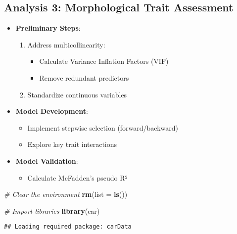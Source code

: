 \documentclass[
]{article}
\newenvironment{Shaded}{\begin{snugshade}}{\end{snugshade}}
\newcommand{\AttributeTok}[1]{\textcolor[rgb]{0.13,0.29,0.53}{#1}}
\newcommand{\CommentTok}[1]{\textcolor[rgb]{0.56,0.35,0.01}{\textit{#1}}}
\newcommand{\FunctionTok}[1]{\textcolor[rgb]{0.13,0.29,0.53}{\textbf{#1}}}
\newcommand{\NormalTok}[1]{#1}
\providecommand{\tightlist}{%
  \setlength{\itemsep}{0pt}\setlength{\parskip}{0pt}}
\begin{document}
\hypertarget{analysis-3-morphological-trait-assessment}{%
\subsection{Analysis 3: Morphological Trait
Assessment}\label{analysis-3-morphological-trait-assessment}}

\begin{itemize}
\tightlist
\item
  \textbf{Preliminary Steps}:

  \begin{enumerate}
  \def\labelenumi{\arabic{enumi}.}
  \tightlist
  \item
    Address multicollinearity:

    \begin{itemize}
    \tightlist
    \item
      Calculate Variance Inflation Factors (VIF)
    \item
      Remove redundant predictors
    \end{itemize}
  \item
    Standardize continuous variables
  \end{enumerate}
\item
  \textbf{Model Development}:

  \begin{itemize}
  \tightlist
  \item
    Implement stepwise selection (forward/backward)
  \item
    Explore key trait interactions
  \end{itemize}
\item
  \textbf{Model Validation}:

  \begin{itemize}
  \tightlist
  \item
    Calculate McFadden's pseudo R²
  \end{itemize}
\end{itemize}

\begin{Shaded}
\begin{Highlighting}[]
\CommentTok{\# Clear the environment}
\FunctionTok{rm}\NormalTok{(}\AttributeTok{list =} \FunctionTok{ls}\NormalTok{())}

\CommentTok{\# Import libraries}
\FunctionTok{library}\NormalTok{(car)}
\end{Highlighting}
\end{Shaded}

\begin{verbatim}
## Loading required package: carData
\end{verbatim}
\end{document}
